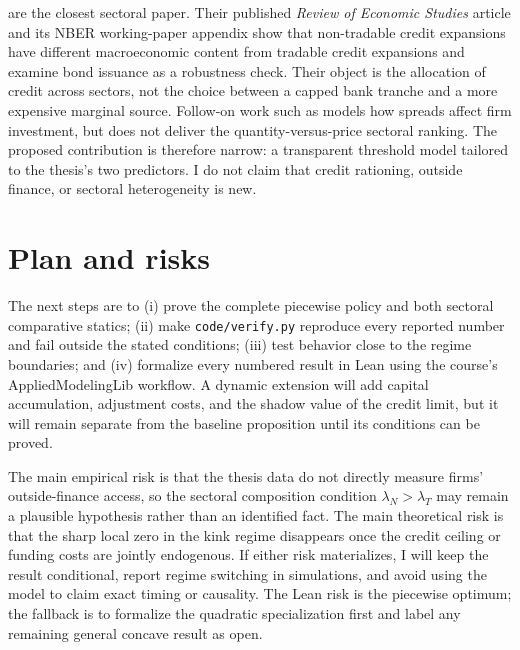 \documentclass[11pt]{article}
\begin{document}
\citet{mullerverner2024} are the closest sectoral paper. Their published
\emph{Review of Economic Studies} article and its NBER working-paper appendix
show that non-tradable credit expansions have different macroeconomic content
from tradable credit expansions and examine bond issuance as a robustness
check. Their object is the allocation of credit across sectors, not the choice
between a capped bank tranche and a more expensive marginal source. Follow-on
work such as \citet{gilchristsimzakrajsek2014} models how spreads affect firm
investment, but does not deliver the quantity-versus-price sectoral ranking.
The proposed contribution is therefore narrow: a transparent threshold model
tailored to the thesis's two predictors. I do not claim that credit rationing,
outside finance, or sectoral heterogeneity is new.

\section{Plan and risks}

The next steps are to (i) prove the complete piecewise policy and both sectoral
comparative statics; (ii) make \texttt{code/verify.py} reproduce every reported
number and fail outside the stated conditions; (iii) test behavior close to the
regime boundaries; and (iv) formalize every numbered result in Lean using the
course's AppliedModelingLib workflow. A dynamic extension will add capital
accumulation, adjustment costs, and the shadow value of the credit limit, but it
will remain separate from the baseline proposition until its conditions can be
proved.

The main empirical risk is that the thesis data do not directly measure firms'
outside-finance access, so the sectoral composition condition
$\lambda_N>\lambda_T$ may remain a plausible hypothesis rather than an
identified fact. The main theoretical risk is that the sharp local zero in the
kink regime disappears once the credit ceiling or funding costs are jointly
endogenous. If either risk materializes, I will keep the result conditional,
report regime switching in simulations, and avoid using the model to claim
exact timing or causality. The Lean risk is the piecewise optimum; the fallback
is to formalize the quadratic specialization first and label any remaining
general concave result as open.



\end{document}
